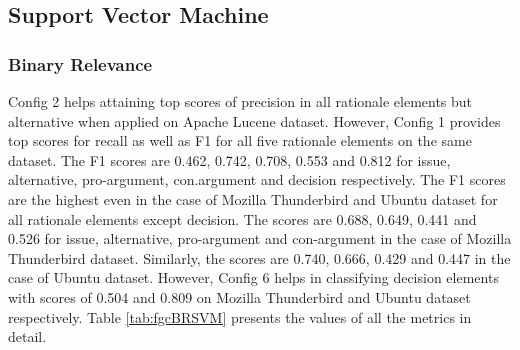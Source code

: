 \documentclass[a4paper,12pt,twoside]{report}
\begin{document}
\subsection{Support Vector Machine}

\subsubsection{Binary Relevance}
Config 2 helps attaining top scores of precision in all rationale elements but alternative when applied on Apache Lucene dataset. However, Config 1 provides top scores for recall as well as F1 for all five rationale elements on the same dataset. The F1 scores are 0.462, 0.742, 0.708, 0.553 and 0.812 for issue, alternative, pro-argument, con.argument and decision respectively. The F1 scores are the highest even in the case of Mozilla Thunderbird and Ubuntu dataset for all rationale elements except decision. The scores are 0.688, 0.649, 0.441 and 0.526 for issue, alternative, pro-argument and con-argument in the case of Mozilla Thunderbird dataset. Similarly, the scores are 0.740, 0.666, 0.429 and 0.447 in the case of Ubuntu dataset. However, Config 6 helps in classifying decision elements with scores of 0.504 and 0.809 on Mozilla Thunderbird and Ubuntu dataset respectively. Table \ref{tab:fgcBRSVM} presents the values of all the metrics in detail.
\end{document}
